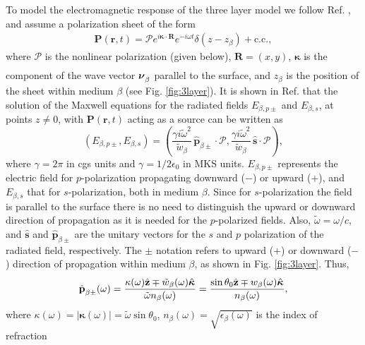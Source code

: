 To model the electromagnetic response of the three layer model we follow Ref.
\cite{mizrahiJOSA88}, and assume a polarization sheet of the form
\begin{align}\label{m31}
\mathbf{P}(\mathbf{r}, t) = 
\boldsymbol{\mathcal{P}}e^{i\boldsymbol{\kappa}\cdot\mathbf{R}}
e^{-i\omega t}\delta(z - z_{\beta}) + \mathrm{c.c.},
\end{align}
where $\boldsymbol{\mathcal{P}}$ is the nonlinear polarization (given below), 
$\mathbf{R}=(x, y)$, $\boldsymbol{\kappa}$ is the component of the wave
vector $\boldsymbol{\nu}^{\strut}_\beta$ parallel to the surface, and
$z_{\beta}$ is the position of the sheet within medium $\beta$ (see Fig.
\ref{fig:3layer}). It is shown in Ref. \cite{sipeJOSAB87} that the
solution of the Maxwell equations for the radiated fields $E_{\beta, p\pm}$ and
$E_{\beta, s}$, at points $z\neq 0$, with $\mathbf{P}(\mathbf{r}, t)$ acting as
a source can be written as
\begin{equation}\label{r2}
(E_{\beta, p\pm}, E_{\beta, s}) = 
 (\frac{\gamma i\tilde\omega^2}{\tilde w_{\beta}}
\,\hat{\mathbf{p}}_{\beta\pm}\cdot\boldsymbol{\mathcal{P}},
\frac{\gamma i\tilde\omega^2}{\tilde w_{\beta}}
\,\hat{\mathbf{s}}\cdot\boldsymbol{\mathcal{P}}),
\end{equation} 
where $\gamma=2\pi$ in cgs units and $\gamma=1/2\epsilon_0$ in MKS units.
$E_{\beta, p\pm}$ represents the electric field for $p$-polarization propagating
downward ($-$) or upward ($+$), and $E_{\beta, s}$ that for $s$-polarization,
both in medium $\beta$. Since for $s$-polarization the field is parallel to the
surface there is no need to distinguish the upward or downward direction of
propagation as it is needed for the $p$-polarized fields. Also,
$\tilde\omega=\omega/c$, and $\hat{\mathbf{s}}$ and
$\hat{\mathbf{p}}_{\beta\pm}$ are the unitary vectors for the $s$ and $p$
polarization of the radiated field, respectively. The $\pm$ notation refers to
upward ($+$) or downward ($-$) direction of propagation within medium $\beta$,
as shown in Fig. \ref{fig:3layer}. Thus,
\begin{equation}\label{r4}
\hat{\mathbf{p}}^{\strut}_{\beta\pm}(\omega) =
\frac{\kappa(\omega)\hat{\mathbf{z}}\mp
\tilde{w}_{\beta}(\omega)\hat{\boldsymbol{\kappa}}} 
{\tilde\omega n_{\beta}(\omega)}
=
\frac{\sin\theta_{0}\hat{\mathbf{z}}\mp 
w_{\beta}(\omega)\hat{\boldsymbol{\kappa}}} 
{n_{\beta}(\omega)}
,
\end{equation}
where $\kappa(\omega) =
|\boldsymbol{\kappa}(\omega)|=\tilde{\omega}\sin\theta_{0}$, 
$n_{\beta}(\omega) = \sqrt{\epsilon_{\beta}(\omega)}$ is the index of refraction
